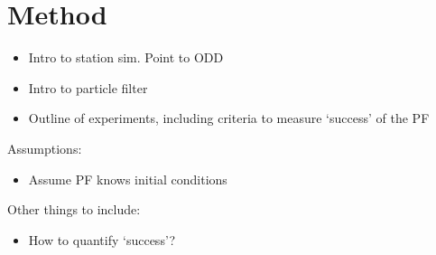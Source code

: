 \section{Method\label{Method}}

\begin{itemize}
\item Intro to station sim. Point to ODD
\item Intro to particle filter
\item Outline of experiments, including criteria to measure `success' of the PF
\end{itemize}

Assumptions:

\begin{itemize}
\item Assume PF knows initial conditions
\end{itemize}

Other things to include: 
\begin{itemize}
\item How to quantify `success'?
\end{itemize}